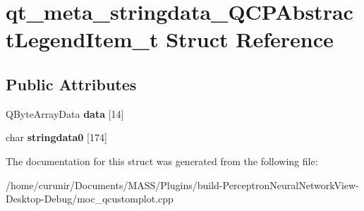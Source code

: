 \hypertarget{structqt__meta__stringdata___q_c_p_abstract_legend_item__t}{}\section{qt\+\_\+meta\+\_\+stringdata\+\_\+\+Q\+C\+P\+Abstract\+Legend\+Item\+\_\+t Struct Reference}
\label{structqt__meta__stringdata___q_c_p_abstract_legend_item__t}
\subsection*{Public Attributes}
\begin{DoxyCompactItemize}
\item 
Q\+Byte\+Array\+Data {\bfseries data} \mbox{[}14\mbox{]}\hypertarget{structqt__meta__stringdata___q_c_p_abstract_legend_item__t_afedc8a30b9d66c03673486e9c892c35b}{}\label{structqt__meta__stringdata___q_c_p_abstract_legend_item__t_afedc8a30b9d66c03673486e9c892c35b}

\item 
char {\bfseries stringdata0} \mbox{[}174\mbox{]}\hypertarget{structqt__meta__stringdata___q_c_p_abstract_legend_item__t_a4987f6d279add0af922402e1f2e28b6b}{}\label{structqt__meta__stringdata___q_c_p_abstract_legend_item__t_a4987f6d279add0af922402e1f2e28b6b}

\end{DoxyCompactItemize}


The documentation for this struct was generated from the following file\+:\begin{DoxyCompactItemize}
\item 
/home/curunir/\+Documents/\+M\+A\+S\+S/\+Plugins/build-\/\+Perceptron\+Neural\+Network\+View-\/\+Desktop-\/\+Debug/moc\+\_\+qcustomplot.\+cpp\end{DoxyCompactItemize}
